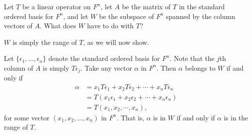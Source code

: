 \label{exercise:lin-tran:col-space-is-range}
Let $T$ be a linear operator on $F^n$, let $A$ be the matrix of $T$ in
the standard ordered basis for $F^n$, and let $W$ be the subspace of
$F^n$ spanned by the column vectors of $A$. What does $W$ have to do
with $T$?
\begin{solution}
  $W$ is simply the range of $T$, as we will now show.

  Let $\{\epsilon_1,\dots,\epsilon_n\}$ denote the standard ordered
  basis for $F^n$. Note that the $j$th column of $A$ is simply
  $T\epsilon_j$. Take any vector $\alpha$ in $F^n$. Then $\alpha$
  belongs to $W$ if and only if
  \begin{align*}
    \alpha
    &= x_1T\epsilon_1 + x_2T\epsilon_2 + \cdots + x_nT\epsilon_n \\
    &= T(x_1\epsilon_1 + x_2\epsilon_2 + \cdots + x_n\epsilon_n) \\
    &= T(x_1,x_2,\cdots,x_n),
  \end{align*}
  for some vector $(x_1,x_2,\dots,x_n)$ in $F^n$. That is, $\alpha$ is
  in $W$ if and only if $\alpha$ is in the range of $T$.
\end{solution}

